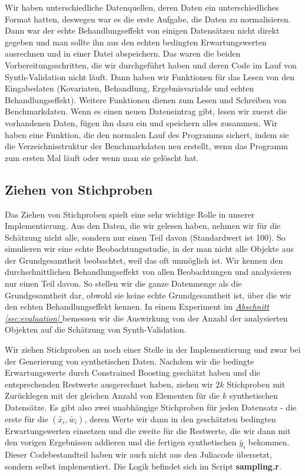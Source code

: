 \documentclass[12pt,a4paper,twoside]{scrartcl}
\numberwithin{equation}{section}
\newcommand{\refsec}[1]{\emph{\hyperref[#1]{Abschnitt \ref*{#1} }}}
\begin{document}
\noindent
Wir haben unterschiedliche Datenquellen, deren Daten ein unterschiedliches Format hatten, deswegen war es die erste Aufgabe, die Daten zu normalisieren. Dann war der echte Behandlungseffekt von einigen Datensätzen nicht direkt gegeben und man sollte ihn aus den echten bedingten Erwartungswerten ausrechnen und in einer Datei abspeichern. Das waren die beiden Vorbereitungsschritten, die wir durchgeführt haben und deren Code im Lauf von Synth-Validation nicht läuft. Dann haben wir Funktionen für das Lesen von den Eingabedaten (Kovariaten, Behandlung, Ergebnisvariable und echten Behandlungseffekt). Weitere Funktionen dienen zum Lesen und Schreiben von Benchmarkdaten. Wenn es einen neuen Dateneintrag gibt, lesen wir zuerst die vorhandenen Daten, fügen ihn dazu ein und speichern alles zusammen. Wir haben eine Funktion, die den normalen Lauf des Programms sichert, indem sie die Verzeichnisstruktur der Benchmarkdaten neu erstellt, wenn das Programm zum ersten Mal läuft oder wenn man sie gelöscht hat.\par

\subsection{Ziehen von Stichproben}\label{subsec:ziehenStichproben}
Das Ziehen von Stichproben spielt eine sehr wichtige Rolle in unserer Implementierung. Aus den Daten, die wir gelesen haben, nehmen wir für die Schätzung nicht alle, sondern nur einen Teil davon (Standardwert ist 100). So simulieren wir eine echte Beobachtungsstudie, in der man nicht alle Objekte aus der Grundgesamtheit beobachtet, weil das oft unmöglich ist. Wir kennen den durchschnittlichen Behandlungseffekt von allen Beobachtungen und analysieren nur einen Teil davon. So stellen wir die ganze Datenmenge als die Grundgesamtheit dar, obwohl sie keine echte Grundgesamtheit ist, über die wir den echten Behandlungseffekt kennen. In einem Experiment im \refsec{sec:evaluation} bemessen wir die Auswirkung von der Anzahl der analysierten Objekten auf die Schätzung von Synth-Validation.\par

\noindent
Wir ziehen Stichproben an noch einer Stelle in der Implementierung und zwar bei der Generierung von synthetischen Daten. Nachdem wir die bedingte Erwartungswerte durch Constrained Boosting geschätzt haben und die entsprechenden Restwerte ausgerechnet haben, ziehen wir $2k$ Stichproben mit Zurücklegen mit der gleichen Anzahl von Elementen für die $k$ synthetischen Datensätze. Es gibt also zwei unabhängige Stichproben für jeden Datensatz - die erste für die $(\tilde{x_i},\tilde{w_i})$, deren Werte wir dann in den geschätzten bedingten Erwartungswerten einsetzen und die zweite für die Restwerte, die wir dann mit den vorigen Ergebnissen addieren und die fertigen synthetischen $\tilde{y_i}$ bekommen. Dieser Codebestandteil haben wir auch nicht aus den Juliacode übersetzt, sondern selbst implementiert. Die Logik befindet sich im Script \textbf{sampling.r}.
\end{document}

